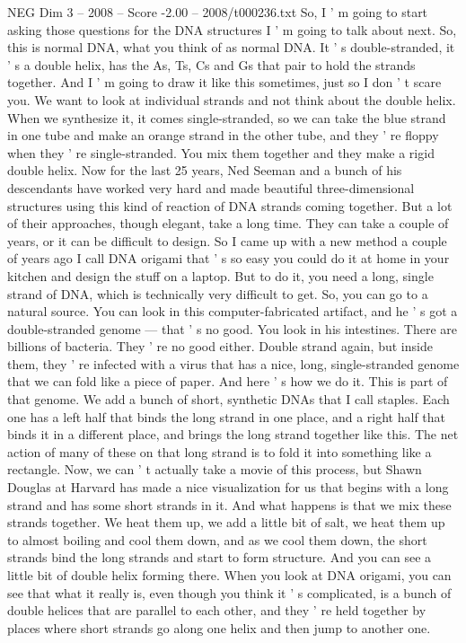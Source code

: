 \begin{textsample}{NEG Dim 3 – 2008 – Score -2.00 – 2008/t000236.txt}
So, I ' m going to start asking those questions for the DNA structures I ' m going to talk about next.
So, this is normal DNA, what you think of as normal DNA.
It ' s double-stranded, it ' s a double helix, has the As, Ts, Cs and Gs that pair to hold the strands together.
And I ' m going to draw it like this sometimes, just so I don ' t scare you.
We want to look at individual strands and not think about the double helix.
When we synthesize it, it comes single-stranded, so we can take the blue strand in one tube and make an orange strand in the other tube, and they ' re floppy when they ' re single-stranded.
You mix them together and they make a rigid double helix.
Now for the last 25 years, Ned Seeman and a bunch of his descendants have worked very hard and made beautiful three-dimensional structures using this kind of reaction of DNA strands coming together.
But a lot of their approaches, though elegant, take a long time.
They can take a couple of years, or it can be difficult to design.
So I came up with a new method a couple of years ago I call DNA origami that ' s so easy you could do it at home in your kitchen and design the stuff on a laptop.
But to do it, you need a long, single strand of DNA, which is technically very difficult to get.
So, you can go to a natural source.
You can look in this computer-fabricated artifact, and he ' s got a double-stranded genome — that ' s no good.
You look in his intestines.
There are billions of bacteria.
They ' re no good either.
Double strand again, but inside them, they ' re infected with a virus that has a nice, long, single-stranded genome that we can fold like a piece of paper.
And here ' s how we do it.
This is part of that genome.
We add a bunch of short, synthetic DNAs that I call staples.
Each one has a left half that binds the long strand in one place, and a right half that binds it in a different place, and brings the long strand together like this.
The net action of many of these on that long strand is to fold it into something like a rectangle.
Now, we can ' t actually take a movie of this process, but Shawn Douglas at Harvard has made a nice visualization for us that begins with a long strand and has some short strands in it.
And what happens is that we mix these strands together.
We heat them up, we add a little bit of salt, we heat them up to almost boiling and cool them down, and as we cool them down, the short strands bind the long strands and start to form structure.
And you can see a little bit of double helix forming there.
When you look at DNA origami, you can see that what it really is, even though you think it ' s complicated, is a bunch of double helices that are parallel to each other, and they ' re held together by places where short strands go along one helix and then jump to another one.

\end{textsample}
